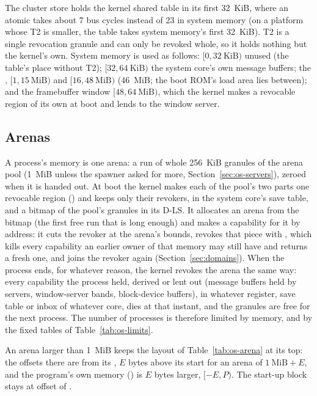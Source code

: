 The cluster store holds the kernel shared table in its first 32~KiB, where an atomic takes about 7 bus
cycles instead of 23 in system memory (on a platform whose T2 is smaller, the table takes system
memory's first 32~KiB). T2 is a single revocation granule and can only be revoked whole, so it holds
nothing but the kernel's own. System memory is used as follows: $[0, 32~\text{KiB})$ unused (the
table's place without T2); $[32, 64~\text{KiB})$ the system core's own message buffers; the , $[1, 15~\text{MiB})$ and $[16, 48~\text{MiB})$
(46~MiB; the boot ROM's load area lies between); and the framebuffer window $[48, 64~\text{MiB})$, which the
kernel makes a revocable region of its own at boot and lends to the window server.

\subsection{Arenas}
A process's memory is one arena: a run of whole 256~KiB granules of the arena pool (1~MiB unless the
spawner asked for more, Section~\ref{sec:os-servers}), zeroed when it is handed out. At boot the kernel
makes each of the pool's two parts one revocable region () and keeps only their revokers, in
the system core's save table, and a bitmap of the pool's granules in its D-LS. It allocates an arena
from the bitmap (the first free run that is long enough) and makes a capability for it by address: it
cuts the revoker at the arena's bounds, revokes that piece with , which kills every
capability an earlier owner of that memory may still have and returns a fresh one, and joins the
revoker again (Section~\ref{sec:domains}). When the process ends, for whatever reason, the kernel
revokes the arena the same way: every capability the process held, derived or lent out (message
buffers held by servers, window-server bands, block-device buffers), in whatever register, save table
or inbox of whatever core, dies at that instant, and the granules are free for the next process. The
number of processes is therefore limited by memory, and by the fixed tables of
Table~\ref{tab:os-limits}.

An arena larger than 1~MiB keeps the layout of Table~\ref{tab:os-arena} at its top: the offsets there
are from its , $E$ bytes above its start for an arena of $1~\text{MiB} + E$, and the
program's own memory () is $E$ bytes larger, $[-E, P)$. The start-up block stays at offset
 of .

